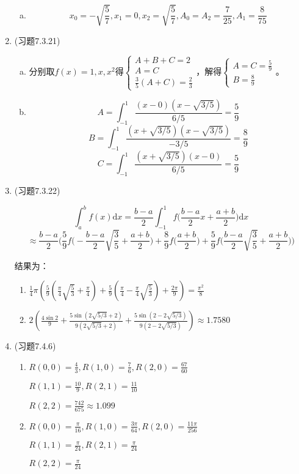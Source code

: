 \documentclass[a4paper,UTF8,fontset=windows]{ctexart}
\begin{document}
\begin{enumerate}
\begin{enumerate}[a.]
    \item 
    $$x_0=-\sqrt{\frac{5}{7}},x_1=0,x_2=\sqrt{\frac{5}{7}},A_0=A_2=\frac{7}{25},A_1=\frac{8}{75}$$
    \end{enumerate}
    
    \item (习题7.3.21)
    \begin{enumerate}[a.]
    \item
    分别取$f(x)=1,x,x^2$得$\begin{cases}A+B+C=2\\A=C\\\frac{3}{5}(A+C)=\frac{2}{3}\end{cases}$，解得$\begin{cases}A=C=\frac{5}{9}\\B=\frac{8}{9}\end{cases}$。
    
    \item
    $$A=\int_{-1}^1\frac{(x-0)(x-\sqrt{3/5})}{6/5}=\frac{5}{9}$$
    $$B=\int_{-1}^1\frac{(x+\sqrt{3/5})(x-\sqrt{3/5})}{-3/5}=\frac{8}{9}$$
    $$C=\int_{-1}^1\frac{(x+\sqrt{3/5})(x-0)}{6/5}=\frac{5}{9}$$
    \end{enumerate}
    
    \item (习题7.3.22)
    
    $$\int_a^bf(x)\mathrm{d}x=\frac{b-a}{2}\int_{-1}^1f\bigg(\frac{b-a}{2}x+\frac{a+b}{2}\bigg)\mathrm{d}x$$
    $$\approx\frac{b-a}{2}\bigg(\frac{5}{9}f\bigg(-\frac{b-a}{2}\sqrt{\frac{3}{5}}+\frac{a+b}{2}\bigg)+\frac{8}{9}f\bigg(\frac{a+b}{2}\bigg)+\frac{5}{9}f\bigg(\frac{b-a}{2}\sqrt{\frac{3}{5}}+\frac{a+b}{2}\bigg)\bigg)$$
    
    结果为：
    \begin{enumerate}
    \item
    $\frac{1}{4}\pi\left(\frac{5}{9}\left(\frac{\pi}{4}\sqrt{\frac{5}{3}}+\frac{\pi}{4}\right)+\frac{5}{9}\left(\frac{\pi}{4}-\frac{\pi}{4}\sqrt{\frac{5}{3}}\right)+\frac{2\pi}{9}\right)=\frac{\pi^2}{8}$
    
    \item 
    $2\left(\frac{4\sin2}{9}+\frac{5\sin(2\sqrt{5/3}+2)}{9(2\sqrt{5/3}+2)}+\frac{5\sin(2-2 \sqrt{5/3})}{9(2-2\sqrt{5/3})}\right)\approx 1.7580$
    \end{enumerate}
    
    \item (习题7.4.6)
    \begin{enumerate}
    \item 
    $R(0,0)=\frac{4}{3},R(1,0)=\frac{7}{6},R(2,0)=\frac{67}{60}$
    
    $R(1,1)=\frac{10}{9},R(2,1)=\frac{11}{10}$
    
    $R(2,2)=\frac{742}{675}\approx1.099$
    
    \item
    $R(0,0)=\frac{\pi}{16},R(1,0)=\frac{3\pi}{64},R(2,0)=\frac{11\pi}{256}$
    
    $R(1,1)=\frac{\pi}{24},R(2,1)=\frac{\pi}{24}$
    
    $R(2,2)=\frac{\pi}{24}$
    \end{enumerate}
\end{enumerate}
\end{document}
